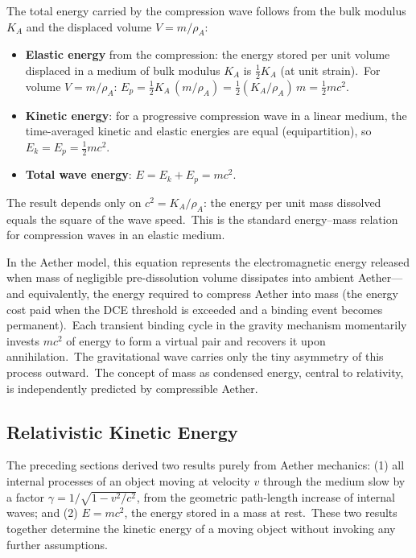 ﻿\documentclass[12pt,letterpaper]{article}
\newcommand{\rhoa}{\rho_{\!A}}
\newcommand{\Ka}{K_{\!A}}
\begin{document}
The total energy carried by the compression wave follows from the bulk
modulus $\Ka$ and the displaced volume $V = m/\rhoa$:

\begin{itemize}[leftmargin=2em]
  \item \textbf{Elastic energy} from the compression: the energy stored per
    unit volume displaced in a medium of bulk modulus $\Ka$ is
    $\tfrac{1}{2}\Ka$ (at unit strain).\ For volume $V = m/\rhoa$:
    $E_p = \tfrac{1}{2}\Ka\,(m/\rhoa) = \tfrac{1}{2}({\Ka}/{\rhoa})\,m
    = \tfrac{1}{2}mc^2$.
  \item \textbf{Kinetic energy}: for a progressive compression wave in
    a linear medium, the time-averaged kinetic and elastic energies are
    equal (equipartition), so $E_k = E_p = \tfrac{1}{2}mc^2$.
  \item \textbf{Total wave energy}: $E = E_k + E_p = mc^2$.
\end{itemize}

The result depends only on $c^2 = \Ka/\rhoa$: the energy per unit mass
dissolved equals the square of the wave speed.\ This is the standard
energy--mass relation for compression waves in an elastic medium.

In the Aether model, this equation represents the electromagnetic energy released when mass
of negligible pre-dissolution volume dissipates into ambient Aether---and equivalently,
the energy required to compress Aether into mass (the energy cost paid when the DCE
threshold is exceeded and a binding event becomes permanent).\ Each transient binding cycle
in the gravity mechanism momentarily invests $mc^2$ of energy to form a virtual pair and
recovers it upon annihilation.\ The gravitational wave carries only the tiny asymmetry of
this process outward.\ The concept of mass as condensed energy, central to relativity, is
independently predicted by compressible Aether.


\subsection{Relativistic Kinetic Energy}

The preceding sections derived two results purely from Aether mechanics: (1) all
internal processes of an object moving at velocity $v$ through the medium slow by
a factor $\gamma = 1/\sqrt{1 - v^2/c^2}$, from the geometric path-length increase
of internal waves; and (2) $E = mc^2$, the energy stored in a mass at rest.\ These
two results together determine the kinetic energy of a moving object without
invoking any further assumptions.
\end{document}
